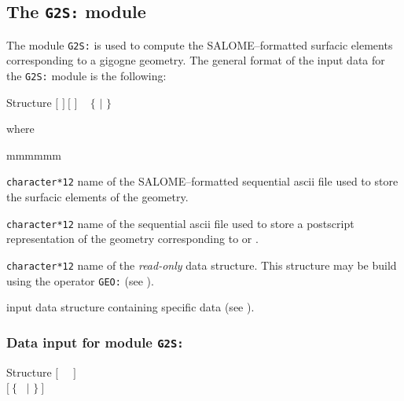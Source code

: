 \subsection{The {\tt G2S:} module}\label{sect:G2SData}

The module {\tt G2S:} is used to compute the SALOME--formatted surfacic elements corresponding
to a gigogne geometry. The general format of the input data for the {\tt G2S:} module is the following:
\begin{DataStructure}{Structure }
$[$  $]~[$  $]$ \moc{:=} ~ $\{$  $|$  $\}$ ~\moc{::}~ \\
\end{DataStructure}

\noindent where
\begin{ListeDeDescription}{mmmmmm}

\item[\dusa{SURFIL}] \texttt{character*12} name of the SALOME--formatted sequential {\sc ascii}
file used to store the surfacic elements of the geometry.

\item[\dusa{PSFIL}] \texttt{character*12} name of the sequential {\sc ascii}
file used to store a postscript representation of the geometry corresponding to  or .

\item[\dusa{GEONAM}] {\tt character*12} name of the {\sl read-only}  data
structure. This structure may be build using the operator {\tt GEO:} (see ).

\item[\dusa{G2S\_data}] input data structure containing specific data (see ).
\end{ListeDeDescription}

\subsubsection{Data input for module {\tt G2S:}}\label{sect:descG2S}

\vskip -0.5cm

\begin{DataStructure}{Structure }
$[$~ ~$]$ \\
$[~\{$~ $|$  $\}~]$ \\
\moc{;}
\end{DataStructure}

